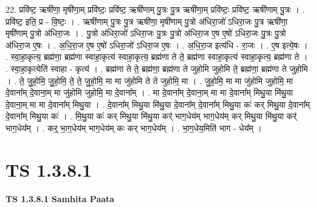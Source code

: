 \documentclass[17pt]{extarticle}
\begin{document}
22. प्रवि॑ष्ट॒ ऋषी॑णा॒ मृषी॑णा॒म् प्रवि॑ष्टः॒ प्रवि॑ष्ट॒ ऋषी॑णाम् पु॒त्रः पु॒त्र ऋषी॑णा॒म् प्रवि॑ष्टः॒ प्रवि॑ष्ट॒ ऋषी॑णाम् पु॒त्रः । . प्रवि॑ष्ट॒ इति॒ प्र - वि॒ष्टः॒ । . ऋषी॑णाम् पु॒त्रः पु॒त्र ऋषी॑णा॒ मृषी॑णाम् पु॒त्रो अ॑धिरा॒जो॑ ऽधिरा॒जः पु॒त्र ऋषी॑णा॒ मृषी॑णाम् पु॒त्रो अ॑धिरा॒जः । . पु॒त्रो अ॑धिरा॒जो॑ ऽधिरा॒जः पु॒त्रः पु॒त्रो अ॑धिरा॒ज ए॒ष ए॒षो॑ ऽधिरा॒जः पु॒त्रः पु॒त्रो अ॑धिरा॒ज ए॒षः । . अ॒धि॒रा॒ज ए॒ष ए॒षो॑ ऽधिरा॒जो॑ ऽधिरा॒ज ए॒षः । . अ॒धि॒रा॒ज इत्य॑धि - रा॒जः । . ए॒ष इत्ये॒षः । . स्वा॒हा॒कृत्य॒ ब्रह्म॑णा॒ ब्रह्म॑णा स्वाहा॒कृत्य॑ स्वाहा॒कृत्य॒ ब्रह्म॑णा ते ते॒ ब्रह्म॑णा स्वाहा॒कृत्य॑ स्वाहा॒कृत्य॒ ब्रह्म॑णा ते । . स्वा॒हा॒कृत्येति॑ स्वाहा - कृत्य॑ । . ब्रह्म॑णा ते ते॒ ब्रह्म॑णा॒ ब्रह्म॑णा ते जुहोमि जुहोमि ते॒ ब्रह्म॑णा॒ ब्रह्म॑णा ते जुहोमि । . ते॒ जु॒हो॒मि॒ जु॒हो॒मि॒ ते॒ ते॒ जु॒हो॒मि॒ मा मा जु॑होमि ते ते जुहोमि॒ मा । . जु॒हो॒मि॒ मा मा जु॑होमि जुहोमि॒ मा दे॒वाना᳚म् दे॒वाना॒म् मा जु॑होमि जुहोमि॒ मा दे॒वाना᳚म् । . मा दे॒वाना᳚म् दे॒वाना॒म् मा मा दे॒वाना᳚म् मिथु॒या मि॑थु॒या दे॒वाना॒म् मा मा दे॒वाना᳚म् मिथु॒या । . दे॒वाना᳚म् मिथु॒या मि॑थु॒या दे॒वाना᳚म् दे॒वाना᳚म् मिथु॒या कः॑ कर् मिथु॒या दे॒वाना᳚म् दे॒वाना᳚म् मिथु॒या कः॑ । . मि॒थु॒या कः॑ कर् मिथु॒या मि॑थु॒या कर्॑ भाग॒धेय॑म् भाग॒धेय॑म् कर् मिथु॒या मि॑थु॒या कर्॑ भाग॒धेय᳚म् । . कर्॒ भा॒ग॒धेय॑म् भाग॒धेय॑म् कः कर् भाग॒धेय᳚म् । . भा॒ग॒धेय॒मिति॑ भाग - धेय᳚म् । \newline
\pagebreak
{}

\section{ TS 1.3.8.1 }

\textbf{TS 1.3.8.1 } \newline
\textbf{Samhita Paata} \newline
\end{document}
